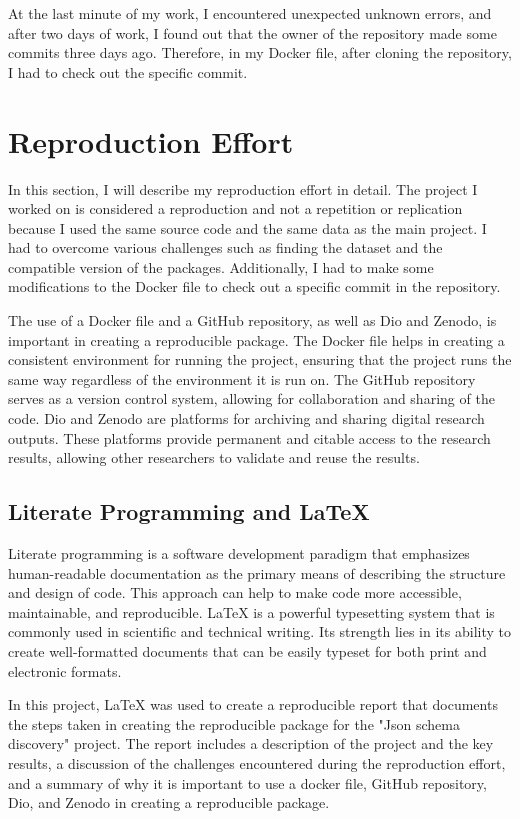 \documentclass[manuscript,screen,review]{acmart}
\begin{document}
At the last minute of my work, I encountered unexpected unknown errors, and after two days of work, I found out that the owner of the repository made some commits three days ago. Therefore, in my Docker file, after cloning the repository, I had to check out the specific commit.

\section*{Reproduction Effort}
In this section, I will describe my reproduction effort in detail. The project I worked on is considered a reproduction and not a repetition or replication because I used the same source code and the same data as the main project. I had to overcome various challenges such as finding the dataset and the compatible version of the packages. Additionally, I had to make some modifications to the Docker file to check out a specific commit in the repository.

The use of a Docker file and a GitHub repository, as well as Dio and Zenodo, is important in creating a reproducible package. The Docker file helps in creating a consistent environment for running the project, ensuring that the project runs the same way regardless of the environment it is run on. The GitHub repository serves as a version control system, allowing for collaboration and sharing of the code. Dio and Zenodo are platforms for archiving and sharing digital research outputs. These platforms provide permanent and citable access to the research results, allowing other researchers to validate and reuse the results.

\subsection{Literate Programming and LaTeX}

Literate programming is a software development paradigm that emphasizes human-readable documentation as the primary means of describing the structure and design of code. This approach can help to make code more accessible, maintainable, and reproducible. LaTeX is a powerful typesetting system that is commonly used in scientific and technical writing. Its strength lies in its ability to create well-formatted documents that can be easily typeset for both print and electronic formats.

In this project, LaTeX was used to create a reproducible report that documents the steps taken in creating the reproducible package for the "Json schema discovery" project. The report includes a description of the project and the key results, a discussion of the challenges encountered during the reproduction effort, and a summary of why it is important to use a docker file, GitHub repository, Dio, and Zenodo in creating a reproducible package.
\end{document}
